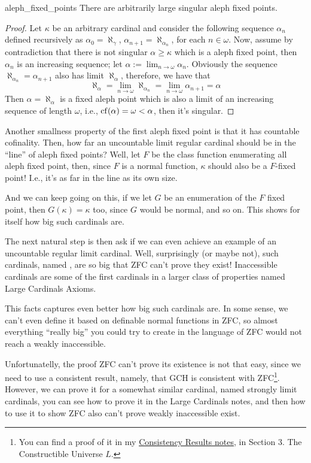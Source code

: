 \begin{lemma}{}{aleph_fixed_points}
    There are arbitrarily large singular aleph fixed points.
\end{lemma}

\begin{proof}
    Let $\kappa$ be an arbitrary cardinal and consider the following sequence $\alpha_n$ defined recursively as $\alpha_0=\aleph_\gamma$, $\alpha_{n+1}=\aleph_{\alpha_n}$, for each $n\in\omega$. Now, assume by contradiction that there is not singular $\alpha\geq\kappa$ which is a aleph fixed point, then $\alpha_n$ is an increasing sequence; let $\alpha:=\lim_{n\to\omega}\alpha_n$. Obviously the sequence $\aleph_{\alpha_n}=\alpha_{n+1}$ also has limit $\aleph_\alpha$, therefore, we have that
    $$\aleph_\alpha=\lim_{n\to\omega}\aleph_{\alpha_n}=\lim_{n\to\omega}\alpha_{n+1}=\alpha$$
    Then $\alpha=\aleph_\alpha$ is a fixed aleph point which is also a limit of an increasing sequence of length $\omega$, i.e., $\mathrm{cf}\!\left(\alpha\right)=\omega<\alpha$, then it's singular.
\end{proof}

Another smallness property of the first aleph fixed point is that it has countable cofinality. Then, how far an uncountable limit regular cardinal should be in the ``line'' of aleph fixed points? Well, let $F$ be the class function enumerating all aleph fixed point, then, since $F$ is a normal function, $\kappa$ should also be a $F$-fixed point! I.e., it's as far in the line as its own size.

And we can keep going on this, if we let $G$ be an enumeration of the $F$ fixed point, then $G(\kappa)=\kappa$ too, since $G$ would be normal, and so on. This shows for itself how big such cardinals are.

The next natural step is then ask if we can even achieve an example of an uncountable regular limit cardinal. Well, surprisingly (or maybe not), such cardinals, named , are so big that ZFC can't prove they exist! Inaccessible cardinals are some of the first cardinals in a larger class of properties named Large Cardinals Axioms.

This facts captures even better how big such cardinals are. In some sense, we can't even define it based on definable normal functions in ZFC, so almost everything ``really big'' you could try to create in the language of ZFC would not reach a weakly inaccessible.

Unfortunatelly, the proof ZFC can't prove its existence is not that easy, since we need to use a consistent result, namely, that GCH is consistent with ZFC\footnote{You can find a proof of it in my \href{https://github.com/Xennonio/Consistency-Results}{Consistency Results notes}, in Section 3. The Constructible Universe $L$.}. However, we can prove it for a somewhat similar cardinal, named strongly limit cardinals, you can see how to prove it in the Large Cardinals notes, and then how to use it to show ZFC also can't prove weakly inaccessible exist.

